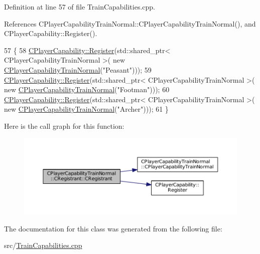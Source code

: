 Definition at line 57 of file Train\+Capabilities.\+cpp.



References C\+Player\+Capability\+Train\+Normal\+::\+C\+Player\+Capability\+Train\+Normal(), and C\+Player\+Capability\+::\+Register().


\begin{DoxyCode}
57                                                     \{
58     \hyperlink{classCPlayerCapability_a7e298018dcde2684451add3cfff065f7}{CPlayerCapability::Register}(std::shared\_ptr< CPlayerCapabilityTrainNormal >(\textcolor{keyword}{
      new} \hyperlink{classCPlayerCapabilityTrainNormal_a80b62a5131937c8230bf6229626dc53c}{CPlayerCapabilityTrainNormal}(\textcolor{stringliteral}{"Peasant"})));   
59     \hyperlink{classCPlayerCapability_a7e298018dcde2684451add3cfff065f7}{CPlayerCapability::Register}(std::shared\_ptr< CPlayerCapabilityTrainNormal >(\textcolor{keyword}{
      new} \hyperlink{classCPlayerCapabilityTrainNormal_a80b62a5131937c8230bf6229626dc53c}{CPlayerCapabilityTrainNormal}(\textcolor{stringliteral}{"Footman"})));
60     \hyperlink{classCPlayerCapability_a7e298018dcde2684451add3cfff065f7}{CPlayerCapability::Register}(std::shared\_ptr< CPlayerCapabilityTrainNormal >(\textcolor{keyword}{
      new} \hyperlink{classCPlayerCapabilityTrainNormal_a80b62a5131937c8230bf6229626dc53c}{CPlayerCapabilityTrainNormal}(\textcolor{stringliteral}{"Archer"})));   
61 \}
\end{DoxyCode}
Here is the call graph for this function\+:\nopagebreak
\begin{figure}[H]
\begin{center}
\leavevmode
\includegraphics[width=350pt]{classCPlayerCapabilityTrainNormal_1_1CRegistrant_a1ff86d5f61a1e9e5e2b9892ac8664848_cgraph}
\end{center}
\end{figure}


The documentation for this class was generated from the following file\+:\begin{DoxyCompactItemize}
\item 
src/\hyperlink{TrainCapabilities_8cpp}{Train\+Capabilities.\+cpp}\end{DoxyCompactItemize}
